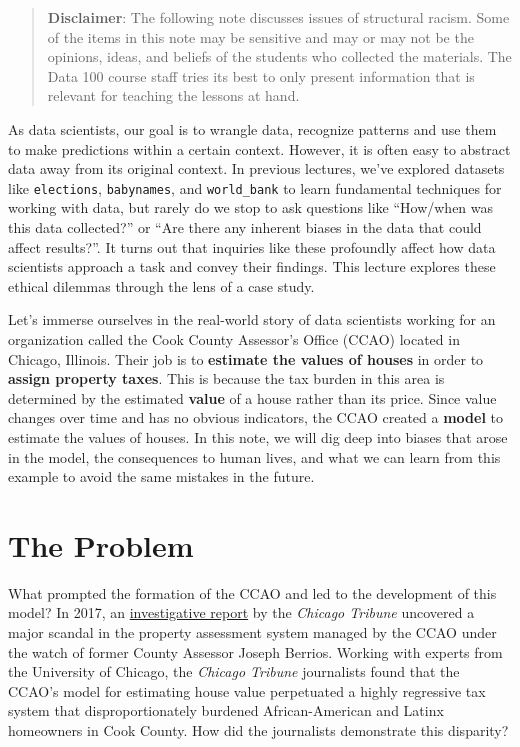 \documentclass[
  letterpaper,
  DIV=11,
  numbers=noendperiod]{scrreprt}
\begin{document}
\begin{quote}
\textbf{Disclaimer}: The following note discusses issues of structural
racism. Some of the items in this note may be sensitive and may or may
not be the opinions, ideas, and beliefs of the students who collected
the materials. The Data 100 course staff tries its best to only present
information that is relevant for teaching the lessons at hand.
\end{quote}

As data scientists, our goal is to wrangle data, recognize patterns and
use them to make predictions within a certain context. However, it is
often easy to abstract data away from its original context. In previous
lectures, we've explored datasets like \texttt{elections},
\texttt{babynames}, and \texttt{world\_bank} to learn fundamental
techniques for working with data, but rarely do we stop to ask questions
like ``How/when was this data collected?'' or ``Are there any inherent
biases in the data that could affect results?''. It turns out that
inquiries like these profoundly affect how data scientists approach a
task and convey their findings. This lecture explores these ethical
dilemmas through the lens of a case study.

Let's immerse ourselves in the real-world story of data scientists
working for an organization called the Cook County Assessor's Office
(CCAO) located in Chicago, Illinois. Their job is to \textbf{estimate
the values of houses} in order to \textbf{assign property taxes}. This
is because the tax burden in this area is determined by the estimated
\textbf{value} of a house rather than its price. Since value changes
over time and has no obvious indicators, the CCAO created a
\textbf{model} to estimate the values of houses. In this note, we will
dig deep into biases that arose in the model, the consequences to human
lives, and what we can learn from this example to avoid the same
mistakes in the future.

\section{The Problem}\label{the-problem}

What prompted the formation of the CCAO and led to the development of
this model? In 2017, an
\href{https://apps.chicagotribune.com/news/watchdog/cook-county-property-tax-divide/assessments.html}{investigative
report} by the \emph{Chicago Tribune} uncovered a major scandal in the
property assessment system managed by the CCAO under the watch of former
County Assessor Joseph Berrios. Working with experts from the University
of Chicago, the \emph{Chicago Tribune} journalists found that the CCAO's
model for estimating house value perpetuated a highly regressive tax
system that disproportionately burdened African-American and Latinx
homeowners in Cook County. How did the journalists demonstrate this
disparity?
\end{document}
